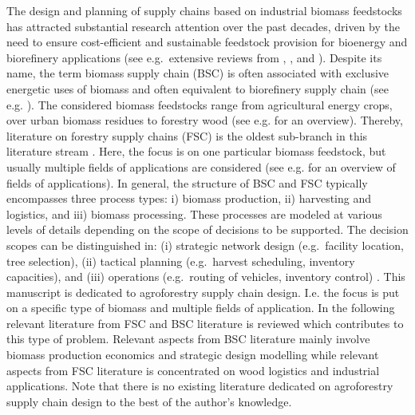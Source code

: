 \documentclass[APA,TimesLARGE]{WileyNJDv5} %
\begin{document}
The design and planning of supply chains based on industrial biomass feedstocks has attracted substantial research attention over the past decades, driven by the need to ensure cost-efficient and sustainable feedstock provision for bioenergy and biorefinery applications (see e.g.~extensive reviews from \cite{Gital2024BiomassSupplyChain}, \cite{Zahraee2020_BSC_review}, and \cite{DeMeyer2014BiomassSupplyChains}). Despite its name, the term biomass supply chain (BSC) is often associated with exclusive energetic uses of biomass and often equivalent to biorefinery supply chain (see e.g. \cite{Espinoza2017_Biorefinery_SC_review}). The considered biomass feedstocks range from agricultural energy crops, over urban biomass residues to forestry wood (see e.g. \cite{Sharma2013_BSC_review} for an overview). Thereby, literature on forestry supply chains (FSC) is the oldest sub-branch in this literature stream \cite{Cambero2014_ForestBSC_Review}. Here, the focus is on one particular biomass feedstock, but usually multiple fields of applications are considered (see e.g. \cite{DAmours2008ORForestSupplyChain} for an overview of fields of applications). In general, the structure of BSC and FSC typically encompasses three process types: i) biomass production, ii) harvesting and logistics, and iii) biomass processing. These processes are modeled at various levels of details depending on the scope of decisions to be supported. The decision scopes can be distinguished in: (i) strategic network design (e.g.~facility location, tree selection), (ii) tactical planning (e.g.~harvest scheduling, inventory capacities), and (iii) operations (e.g.~routing of vehicles, inventory control) \cite{DeMeyer2014BiomassSupplyChains}. This manuscript is dedicated to agroforestry supply chain design. I.e. the focus is put on a specific type of biomass and multiple fields of application. In the following relevant literature from FSC and BSC literature is reviewed which contributes to this type of problem. Relevant aspects from BSC literature mainly involve biomass production economics and strategic design modelling while relevant aspects from FSC literature is concentrated on wood logistics and industrial applications. Note that there is no existing literature dedicated on agroforestry supply chain design to the best of the author's knowledge.
\end{document}
